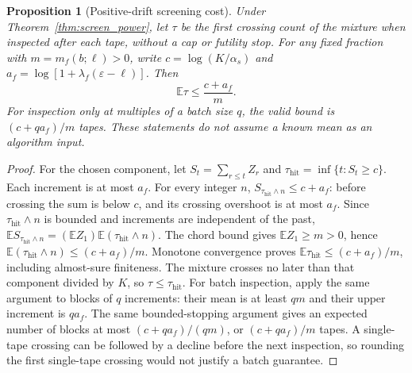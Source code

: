 \documentclass[preprint,11pt,sort&compress]{elsarticle}
\newtheorem{proposition}[theorem]{Proposition}
\newcommand{\E}{\mathbb E}
\begin{document}
\begin{proposition}[Positive-drift screening cost]
\label{prop:screen_drift}
Under Theorem~\ref{thm:screen_power}, let $\tau$ be the first crossing count
of the mixture when inspected after each tape, without a cap or futility
stop. For any fixed fraction with $m=m_f(b;\ell)>0$, write
$c=\log(K/\alpha_s)$ and $a_f=\log[1+\lambda_f(\varepsilon-\ell)]$. Then
\begin{equation}
 \E\tau\le\frac{c+a_f}{m}.
 \label{eq:screen_drift_cost}
\end{equation}
For inspection only at multiples of a batch size $q$, the valid bound is
$(c+qa_f)/m$ tapes. These statements do not assume a known mean as an
algorithm input.
\end{proposition}
\begin{proof}
For the chosen component, let $S_t=\sum_{r\le t}Z_r$ and
$\tau_{\mathrm{hit}}=\inf\{t:S_t\ge c\}$. Each increment is at most $a_f$. For every integer
$n$, $S_{\tau_{\mathrm{hit}}\wedge n}\le c+a_f$: before crossing the sum is below $c$, and
its crossing overshoot is at most $a_f$. Since $\tau_{\mathrm{hit}}\wedge n$ is bounded and
increments are independent of the past,
$\E S_{\tau_{\mathrm{hit}}\wedge n}=(\E Z_1)\E(\tau_{\mathrm{hit}}\wedge n)$. The chord bound gives
$\E Z_1\ge m>0$, hence $\E(\tau_{\mathrm{hit}}\wedge n)\le(c+a_f)/m$.
Monotone convergence proves $\E \tau_{\mathrm{hit}}\le(c+a_f)/m$, including almost-sure
finiteness. The mixture crosses no later than that component divided by
$K$, so $\tau\le \tau_{\mathrm{hit}}$. For batch inspection, apply the same argument to
blocks of $q$ increments: their mean is at least $qm$ and their upper
increment is $qa_f$. The same bounded-stopping argument
gives an expected number of blocks at most $(c+qa_f)/(qm)$, or
$(c+qa_f)/m$ tapes. A single-tape crossing can be followed by a decline before
the next inspection, so rounding the first single-tape crossing would not
justify a batch guarantee.
\end{proof}
\end{document}
